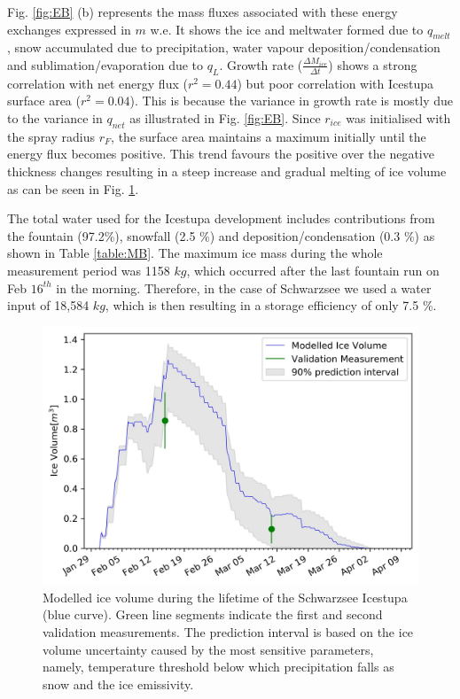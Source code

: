 \documentclass[utf8]{frontiersSCNS} %
\begin{document}
Fig. \ref{fig:EB} (b) represents the mass fluxes associated with these energy exchanges expressed in $m$ w.e. It shows
the ice and meltwater formed due to $q_{melt}$, snow accumulated due to precipitation, water vapour
deposition/condensation and sublimation/evaporation due to $q_L$. Growth rate ($\frac{\Delta M_{ice}}{\Delta t}$) shows
a strong correlation with net energy flux ($r^2 = 0.44$) but poor correlation with Icestupa surface area ($r^2 = 0.04$).
This is because the variance in growth rate is mostly due to the variance in $q_{net}$ as illustrated in Fig.
\ref{fig:EB}. Since $r_{ice}$ was initialised with the spray radius $r_F$, the surface area maintains a maximum
initially until the energy flux becomes positive. This trend favours the positive over the negative thickness changes
resulting in a steep increase and gradual melting of ice volume as can be seen in Fig. \ref{fig:results}.

The total water used for the Icestupa development includes contributions from the fountain (97.2\%), snowfall (2.5 \%)
and deposition/condensation (0.3 \%) as shown in Table \ref{table:MB}. The maximum ice mass during the whole measurement
period was 1158 $kg$, which occurred after the last fountain run on Feb $16^{th}$ in the morning. Therefore, in the case
of Schwarzsee we used a water input of 18,584 $kg$, which is then resulting in a storage efficiency of only 7.5 \%.

  \begin{figure} \begin{center} \includegraphics[width=15 cm]{Figures/Figure_8.jpg} \end{center} \caption{Modelled ice
    volume during the lifetime of the Schwarzsee Icestupa (blue curve). Green line segments indicate the first and
    second validation measurements. The prediction interval is based on the ice volume uncertainty caused by the most
    sensitive parameters, namely, temperature threshold below which precipitation falls as snow and the ice emissivity.}
  \label{fig:results} \end{figure}
  
\end{document}
